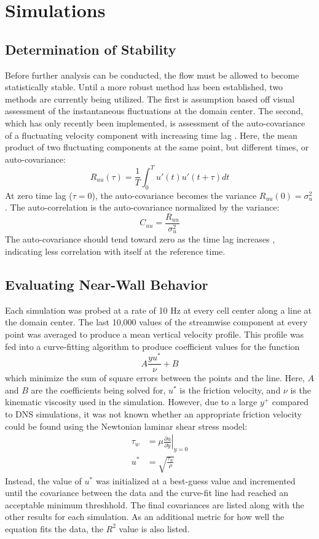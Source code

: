 \documentclass[12pt]{article}
\begin{document}
\section{Simulations}
\subsection{Determination of Stability}
Before further analysis can be conducted, the flow must be allowed to become statistically stable.  Until a more robust method has been established, two methods are currently being utilized.  The first is assumption based off visual assessment of the instantaneous fluctuations at the domain center.  The second, which has only recently been implemented, is assessment of the auto-covariance of a fluctuating velocity component with increasing time lag \cite{shi01, wyngaard01}.  Here, the mean product of two fluctuating components at the same point, but different times, or auto-covariance:
\begin{equation}
	R_{uu}(\tau) = \frac{1}{T} \int_0^T u'(t)u'(t+\tau)dt	
\end{equation}
At zero time lag ($\tau=0$), the auto-covariance becomes the variance $R_{uu}(0)=\sigma_u^2$.  The auto-correlation is the auto-covariance normalized by the variance:
\begin{equation}
C_{uu} = \frac{R_{uu}}{\sigma_u^2}
\end{equation}
The auto-covariance should tend toward zero as the time lag increases \citep{shi01}, indicating less correlation with itself at the reference time.

\subsection{Evaluating Near-Wall Behavior}
Each simulation was probed at a rate of 10 Hz at every cell center along a line at the domain center.  The last 10,000 values of the streamwise component at every point was averaged to produce a mean vertical velocity profile.  This profile was fed into a curve-fitting algorithm to produce coefficient values for the function
\begin{equation}
A \frac{y u^*}{\nu} + B
\end{equation}
which minimize the sum of square errors between the points and the line.  Here, $A$ and $B$ are the coefficients being solved for, $u^*$ is the friction velocity, and $\nu$ is the kinematic viscosity used in the simulation.  However, due to a large $y^+$ compared to DNS simulations, it was not known whether an appropriate friction velocity could be found using the Newtonian laminar shear stress model:
\begin{align}
\tau_w &= \left. \mu \frac{\partial u}{\partial y} \right|_{y=0} \\
u^* &= \sqrt{\frac{\tau_w}{\rho}} 
\end{align}
Instead, the value of $u^*$ was initialized at a best-guess value and incremented until the covariance between the data and the curve-fit line had reached an acceptable minimum threshhold.  The final covariances are listed along with the other results for each simulation.  As an additional metric for how well the equation fits the data, the $R^2$ value is also listed.
\end{document}
